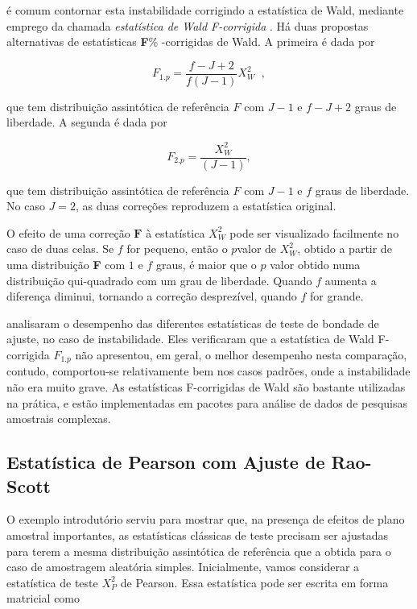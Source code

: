 \documentclass[]{book}
\numberwithin{example}{chapter}
\numberwithin{remark}{chapter}
\numberwithin{definition}{chapter}
\begin{document}
é comum contornar esta instabilidade corrigindo a estatística de Wald,
mediante emprego da chamada \emph{estatística de Wald F-corrigida} . Há
duas propostas alternativas de estatísticas \textbf{F}\% -corrigidas de
Wald. A primeira é dada por

\begin{equation}
F_{1.p}=\frac{f-J+2}{f\left( J-1\right) }X_{W}^{2}\;\;,  
\label{eq:qual9}
\end{equation}

que tem distribuição assintótica de referência \(F\) com \(J-1\) e
\(f-J+2\) graus de liberdade. A segunda é dada por

\begin{equation}
F_{2.p}=\frac{X_{W}^{2}}{\left( J-1\right) },  
\label{eq:qual10}
\end{equation}

que tem distribuição assintótica de referência \(F\) com \(J-1\) e \(f\)
graus de liberdade. No caso \(J=2\), as duas correções reproduzem a
estatística original.

O efeito de uma correção \(\mathbf{F}\) à estatística \(X_{W}^{2}\) pode
ser visualizado facilmente no caso de duas celas. Se \(f\) for pequeno,
então o \(p\)valor de \(X_{W}^{2}\), obtido a partir de uma distribuição
\textbf{F} com \(1\) e \(f\) graus, é maior que o \(p\) valor obtido
numa distribuição qui-quadrado com um grau de liberdade. Quando \(f\)
aumenta a diferença diminui, tornando a correção desprezível, quando
\(f\) for grande.

\citep{TR87} analisaram o desempenho das diferentes estatísticas de
teste de bondade de ajuste, no caso de instabilidade. Eles verificaram
que a estatística de Wald F-corrigida \(F_{1.p}\) não apresentou, em
geral, o melhor desempenho nesta comparação, contudo, comportou-se
relativamente bem nos casos padrões, onde a instabilidade não era muito
grave. As estatísticas F-corrigidas de Wald são bastante utilizadas na
prática, e estão implementadas em pacotes para análise de dados de
pesquisas amostrais complexas.

\subsection{Estatística de Pearson com Ajuste de
Rao-Scott}\label{raoscott}

O exemplo introdutório serviu para mostrar que, na presença de efeitos
de plano amostral importantes, as estatísticas clássicas de teste
precisam ser ajustadas para terem a mesma distribuição assintótica de
referência que a obtida para o caso de amostragem aleatória simples.
Inicialmente, vamos considerar a estatística de teste \(X_{P}^{2}\) de
Pearson\(.\) Essa estatística pode ser escrita em forma matricial como
\end{document}

